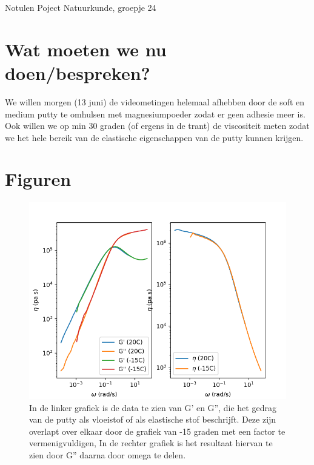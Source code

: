\documentclass[11pt,a4paper]{article}
\begin{document}
\begin{Minutes}{Notulen Poject Natuurkunde, groepje 24}
\section{Wat moeten we nu doen/bespreken?}
We willen morgen (13 juni) de videometingen helemaal afhebben door de soft en medium putty te omhulsen met magnesiumpoeder zodat er geen adhesie meer is. Ook willen we op min 30 graden (of ergens in de trant) de viscositeit meten zodat we het hele bereik van de elastische eigenschappen van de putty kunnen krijgen.

\section{Figuren}
\begin{figure}[h]
    \centering
    \includegraphics[width=0.5\linewidth]{Rheometerdata.png}
    \caption{In de linker grafiek is de data te zien van G' en G'', die het gedrag van de putty als vloeistof of als elastische stof beschrijft. Deze zijn overlapt over elkaar door de grafiek van -15 graden met een factor te vermenigvuldigen, In de rechter grafiek is het resultaat hiervan te zien door G'' daarna door omega te delen.}
    \label{fig:enter-label}
\end{figure}

\end{Minutes}
\end{document}
